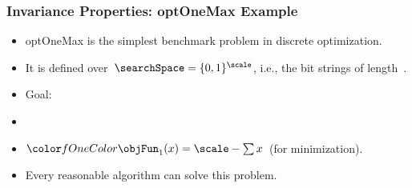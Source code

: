 \documentclass[aspectratio=169,mathserif,notheorems]{beamer}%
\begin{document}
%
\begin{frame}%
\frametitle{Invariance Properties: \gls{optOneMax} Example}%
\parbox{0.415\paperwidth}{%
\begin{itemize}%
\item \gls{optOneMax} is the simplest benchmark problem in discrete optimization\cite{DJW2006UALBFRSHIBBO,M1992HGARWMAH,ZWWW2026WFFAFTSIFGLS}.%
\item<2-> It is defined over~$\searchSpace=\{0,1\}^{\scale}$, i.e., the bit strings of length~\scale.%
\item<3-> Goal:~%
\item<4-> %
\item<5-> $\fn{1}(x)=\scale-\sum{x}$~(for minimization).%
\item<6-> Every reasonable algorithm can solve this problem.%
\end{itemize}%
}%
%
%
%
\end{frame}%
%
%
\end{document}
